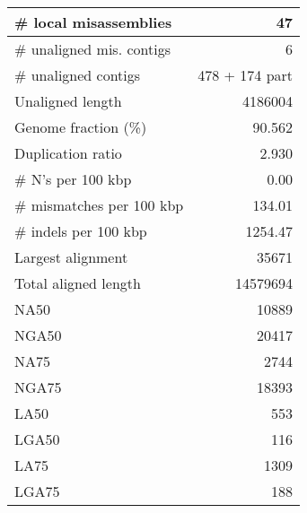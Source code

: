 \documentclass[12pt,a4paper]{article}
\begin{document}
\begin{table}[ht]
\begin{center}
\begin{tabular}{|l*{1}{|r}|}
\# local misassemblies & 47 \\ \hline
\# unaligned mis. contigs & 6 \\ \hline
\# unaligned contigs & 478 + 174 part \\ \hline
Unaligned length & 4186004 \\ \hline
Genome fraction (\%) & 90.562 \\ \hline
Duplication ratio & 2.930 \\ \hline
\# N's per 100 kbp & 0.00 \\ \hline
\# mismatches per 100 kbp & 134.01 \\ \hline
\# indels per 100 kbp & 1254.47 \\ \hline
Largest alignment & 35671 \\ \hline
Total aligned length & 14579694 \\ \hline
NA50 & 10889 \\ \hline
NGA50 & 20417 \\ \hline
NA75 & 2744 \\ \hline
NGA75 & 18393 \\ \hline
LA50 & 553 \\ \hline
LGA50 & 116 \\ \hline
LA75 & 1309 \\ \hline
LGA75 & 188 \\ \hline
\end{tabular}
\end{center}
\end{table}
\end{document}

